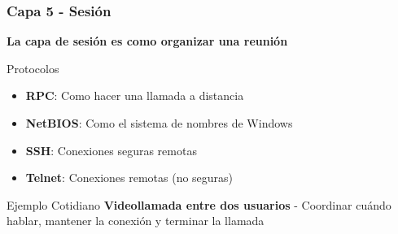 \documentclass[aspectratio=169]{beamer}
\begin{document}
            \begin{frame}
              \frametitle{Capa 5 - Sesión}
              
              \begin{center}
              \Large \textbf{La capa de sesión es como organizar una reunión}
              \end{center}
              
              
              \begin{block}{Protocolos}
              \begin{itemize}
              \item \textbf{RPC}: Como hacer una llamada a distancia
              \item \textbf{NetBIOS}: Como el sistema de nombres de Windows
              \item \textbf{SSH}: Conexiones seguras remotas
              \item \textbf{Telnet}: Conexiones remotas (no seguras)
              \end{itemize}
              \end{block}
              
              \begin{block}{Ejemplo Cotidiano}
              \textbf{Videollamada entre dos usuarios} - Coordinar cuándo hablar, mantener 
la conexión y terminar la llamada
              \end{block}
              \end{frame}
            
\end{document}
